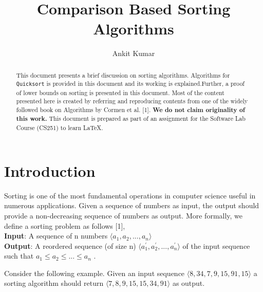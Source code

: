 \documentclass[a4paper, 10pt,twocolumn]{article}
\title{Comparison Based Sorting Algorithms}
\author{Ankit Kumar}
\date{}
\begin{document}
\maketitle
\begin{abstract}
  This document presents a brief discussion on sorting algorithms. Algorithms for \texttt{Quicksort} is provided in this document and its working is explained.Further, a proof of lower bounds on sorting is presented in this document. Most of the content presented here is created by referring and reproducing contents from one of the widely followed book on Algorithms by Cormen et al. [1]. {\bf We do not claim originality of this work.} This document is prepared as part of an assignment for the Software Lab Course (CS251) to learn \LaTeX .
\end{abstract}
\section{Introduction}
Sorting is one of the most fundamental operations in computer science useful in numerous applications. Given a sequence of numbers as input, the output should provide a non-decreasing sequence of numbers as output. More formally, we define a sorting problem as follows [1],
\\{\bf Input}: A sequence of n numbers  $ \langle a_1,a_2,...,a_n \rangle $
\\{\bf Output}: A reordered sequence (of size n) $ \langle a_1^{'} ,a_2^{'} ,...,a_n^{'} \rangle$ of the input sequence such that $ a_1 \leq a_2 \leq ... \leq a_n $ .

Consider the following example. Given an input sequence $\langle 8, 34, 7, 9, 15, 91, 15 \rangle$ a sorting algorithm should return $\langle 7, 8, 9, 15, 15, 34, 91 \rangle$ as output.
\end{document}
